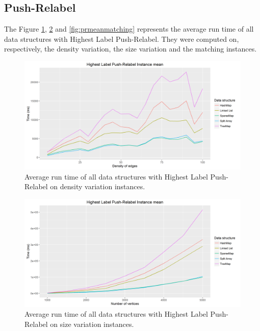 \subsection{Push-Relabel}	
The Figure \ref{fig:prmeandensity}, \ref{fig:prmeansize} and \ref{fig:prmeanmatching} represents the average run time of all data structures with Highest Label Push-Relabel. They were computed on, respectively, the density variation, the size variation and the matching instances.
\begin{figure}[H]
\begin{center}
\includegraphics[scale=0.5]{images/prmeandensity.png}
\caption{Average run time of all data structures with Highest Label Push-Relabel on density variation instances.}
\label{fig:prmeandensity}
\end{center}
\end{figure}
\begin{figure}[H]
\begin{center}
\includegraphics[scale=0.5]{images/prmeansize.png}
\caption{Average run time of all data structures with Highest Label Push-Relabel on size variation instances.}
\label{fig:prmeansize}
\end{center}
\end{figure}
